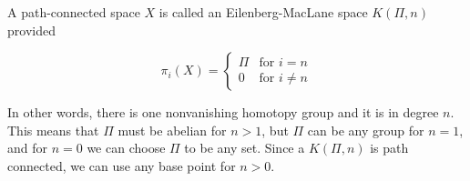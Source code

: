 A path-connected space $X$ is called an Eilenberg-MacLane space $K(\Pi, n)$ provided

$$\pi_i(X) = \begin{cases} \Pi & \text{for } i = n \\ 0 & \text{for } i \neq n \end{cases}$$

In other words, there is one nonvanishing homotopy group and it is in degree $n$. This means that $\Pi$ must be abelian for $n > 1$, but $\Pi$ can be any group for $n = 1$, and for $n = 0$ we can choose $\Pi$ to be any set. Since a $K(\Pi, n)$ is path connected, we can use any base point for $n > 0$.
